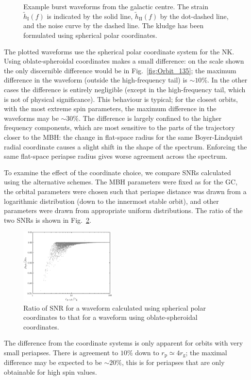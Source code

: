 \documentclass[useAMS,usedcolumn,usegraphicx,usenatbib]{mn2e}
\newcommand{\figref}[1]{Fig.~\ref{fig:#1}}
\newcommand{\sub}[1]{\ensuremath{_\mathrm{#1}}}
\begin{document}
\begin{figure}
\begin{center}
\caption{Example burst waveforms from the galactic centre. The strain $\widetilde{h}\sub{I}(f)$ is indicated by the solid line, $\widetilde{h}\sub{II}(f)$ by the dot-dashed line, and the noise curve by the dashed line. The kludge has been formulated using spherical polar coordinates.\label{fig:Examples}}
  \end{center}
\end{figure}

The plotted waveforms use the spherical polar coordinate system for the NK. Using oblate-spheroidal coordinates makes a small difference: on the scale shown the only discernible difference would be in \figref{Orbit_135}; the maximum difference in the waveform (outside the high-frequency tail) is $\sim 10\%$. In the other cases the difference is entirely negligible (except in the high-frequency tail, which is not of physical significance). This behaviour is typical; for the closest orbits, with the most extreme spin parameters, the maximum difference in the waveforms may be $\sim30\%$. The difference is largely confined to the higher frequency components, which are most sensitive to the parts of the trajectory closer to the MBH: the change in flat-space radius for the same Boyer-Lindquist radial coordinate causes a slight shift in the shape of the spectrum. Enforcing the same flat-space periapse radius gives worse agreement across the spectrum.

To examine the effect of the coordinate choice, we compare SNRs calculated using the alternative schemes. The MBH parameters were fixed as for the GC, the orbital parameters were chosen such that periapse distance was drawn from a logarithmic distribution (down to the innermost stable orbit), and other parameters were drawn from appropriate uniform distributions. The ratio of the two SNRs is shown in \figref{Oblate_sphere}.
\begin{figure}
\begin{center}
 \includegraphics[width=0.43\textwidth]{Fig_SNR_ratio}
 \caption{Ratio of SNR for a waveform calculated using spherical polar coordinates to that for a waveform using oblate-spheroidal coordinates.\label{fig:Oblate_sphere}}
   \end{center}
\end{figure}
The difference from the coordinate systems is only apparent for orbits with very small periapses. There is agreement to $10\%$ down to $r\sub{p} \simeq 4 r\sub{g}$; the maximal difference may be expected to be $\sim 20\%$, this is for periapses that are only obtainable for high spin values.
\end{document}
